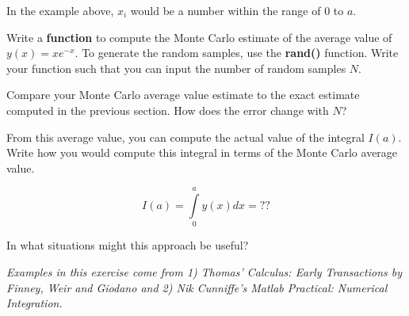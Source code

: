 \documentclass[10pt,fleqn]{article}
\begin{document}
In the example above, $x_i$ would be a number within the range of 0 to $a$.

Write a \textbf{function} to compute the Monte Carlo estimate of the average value of $y(x)=xe^{-x}$. To generate the random samples, use the \textbf{rand()} function. Write your function such that you can input the number of random samples $N$.

Compare your Monte Carlo average value estimate to the exact estimate computed in the previous section. How does the error change with $N$?

From this average value, you can compute the actual value of the integral $I(a)$. Write how you would compute this integral in terms of the Monte Carlo average value.

$$I(a) = \int\limits_0^a y(x) dx = ??$$

In what situations might this approach be useful?

\vfill

\textit{Examples in this exercise come from 1) Thomas' Calculus: Early Transactions by Finney, Weir and Giodano and 2) Nik Cunniffe's Matlab Practical: Numerical Integration.}
\end{document}
